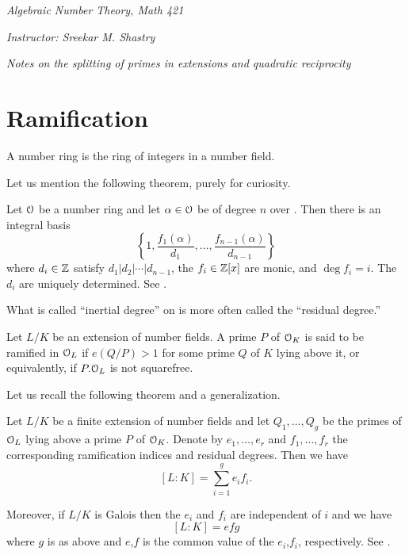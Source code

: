 \documentclass[10pt,a4paper]{amsart}
\begin{document}


\noindent \textit{Algebraic Number Theory, Math 421}

\noindent \textit{Instructor: Sreekar M. Shastry}

\noindent \emph{Notes on the splitting of primes in extensions and quadratic reciprocity}

\section{Ramification}

\begin{terminology}
A number ring is the ring of integers in a number field.
\end{terminology}

Let us mention the following theorem, purely for curiosity.

\begin{thm}
Let $\mathcal{O}$ be a number ring and let $\alpha\in \mathcal{O}$ be of degree $n$ over \Q{}.
Then there is an integral basis \[\left\{ 1,\frac{f_1(\alpha)}{d_1}, \dots,
\frac{f_{n-1}(\alpha)}{d_{n-1}} \right\}\] where $d_i\in \mathbb{Z}$ satisfy
$d_1|d_2|\cdots|d_{n-1}$, the $f_i\in \mathbb{Z}[x]$ are monic, and $\deg f_i = i.$ The
$d_i$ are uniquely determined. See \cite[13, p.36]{M}.
\end{thm}

\begin{terminology}
What is called ``inertial degree'' on \cite[p.64]{M} is more often called the
``residual degree.''
\end{terminology}

\begin{defn}
Let $L/K$ be an extension of number fields. A prime $P$ of $\mathcal{O}_K$ is said to be
ramified in $\mathcal{O}_L$ if $e(Q/P) > 1$ for some prime $Q$ of $K$ lying above it, or
equivalently, if $P.\mathcal{O}_L$ is not squarefree.
\end{defn}

Let us recall the following theorem \cite[21, p.65]{M} and a generalization.

\begin{thm}
Let $L/K$ be a finite extension of number fields and let $Q_1,\dots,Q_g$ be the
primes of $\mathcal{O}_L$ lying above a prime $P$ of $\mathcal{O}_K.$ Denote by $e_1,\dots,e_r$
and $f_1,\dots,f_r$ the corresponding ramification indices and residual
degrees. Then we have \[ [L:K] = \sum_{i=1}^{g} e_i f_i.\]
\end{thm}

\begin{thm}
Moreover, if $L/K$ is Galois then the $e_i$ and $f_i$ are independent of $i$
and we have \[ [L:K] = efg\] where $g$ is as above and $e$,$f$ is the common
value of the $e_i$,$f_i$, respectively. See \cite[20, p.117]{FT}.
\end{thm}
\end{document}
